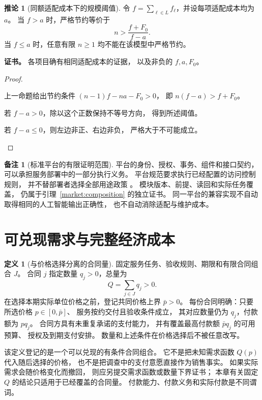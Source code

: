 \documentclass[UTF8,12pt,a4paper,openany,fontset=none,zihao=false]{ctexrep}
\theoremstyle{definition}
\newtheorem{definition}{定义}[chapter]
\newtheorem{corollary}{推论}[chapter]
\newtheorem{remark}{备注}[chapter]
\newenvironment{certificate}{\par\noindent\textbf{证书。}\ignorespaces}{\par}
\newcommand{\1}{\mathbf 1}
\begin{document}
\begin{corollary}[同额适配成本下的规模阈值]
\label{market:reuse-scale}
令 \(f=\sum_{\ell\in L}f_\ell\)，并设每项适配成本均为 \(a\)。
当 \(f>a\) 时，严格节约等价于
\[
 n>\frac{f+F_0}{f-a}.
\]
当 \(f\le a\) 时，任意有限 \(n\ge1\) 均不能在该模型中严格节约。
\end{corollary}
\begin{certificate}
各项目确有相同适配成本的证据，
以及非负的 \(f,a,F_0\)。
\end{certificate}
\begin{proof}
\begin{semanticsteps}
\item 上一命题给出节约条件
\((n-1)f-na-F_0>0\)，
即 \(n(f-a)>f+F_0\)。
\item 若 \(f-a>0\)，除以这个正数保持不等号方向，
得到所述阈值。
\item 若 \(f-a\le0\)，则左边非正、右边非负，
严格大于不可能成立。
\end{semanticsteps}
\end{proof}

\begin{remark}[标准平台的有限证明范围]
平台的身份、授权、事务、组件和接口契约，
可以承担服务部署中的一部分执行义务。
平台规范要求执行已经配置的访问控制规则，
并不替部署者选择全部用途政策
\cite{JakartaPlatform11}。
模块版本、前提、读回和实际任务覆盖，
仍属于引理~\ref{market:composition} 的独立证书。
同一平台的兼容实现不自动取得相同的人工智能输出正确性，
也不自动消除适配与维护成本。
\end{remark}

\section{可兑现需求与完整经济成本}

\begin{definition}[与价格选择分离的合同量]
\label{market:contract-demand}
固定服务任务、验收规则、期限和有限合同组合 \(J\)。
合同 \(j\) 指定数量 \(q_j>0\)，总量为
\[
 Q=\sum_{j\in J}q_j>0.
\]
在选择本期实际单位价格之前，登记共同价格上界
\(\bar p>0\)。
每份合同明确：只要所选价格
\(p\in[0,\bar p]\)、
服务按约交付且验收条件成立，
其对应数量仍为 \(q_j\)，付款额为 \(p q_j\)。
合同方具有未重复承诺的支付能力，
并有覆盖最高付款额 \(\bar p q_j\) 的可用预算、
授权及到期支付安排。
数量和上述条件在价格选择后不被任意改写。
\end{definition}

该定义登记的是一个可以兑现的有条件合同组合。
它不是把未知需求函数 \(Q(p)\) 代入随后选择的价格，
也不是把调查中的支付意愿直接作为销售事实。
如果实际需求会随价格变化而撤回，
则应另提交需求函数或数量下界证书；
本章有关固定 \(Q\) 的结论只适用于已经覆盖的合同量。
付款能力、付款义务和实际付款是不同谓词。
\end{document}
